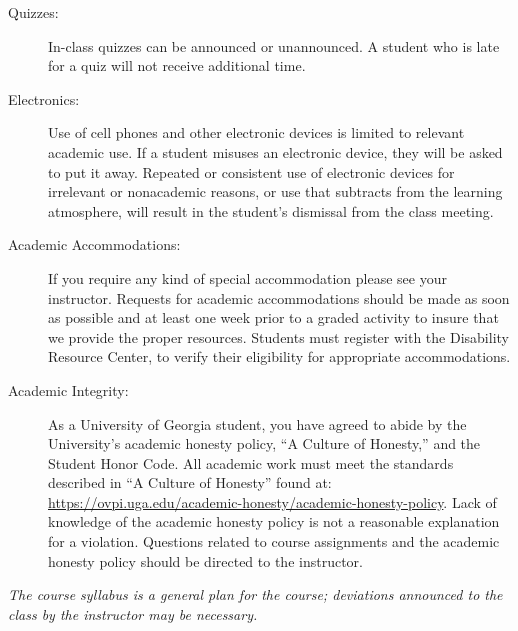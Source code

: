 \documentclass[letterpaper,11pt]{article}
\begin{document}
\begin{description}



\item[Quizzes:] In-class quizzes can be announced or unannounced. A student who is late for a quiz will not receive additional time.

\item[Electronics:] Use of cell phones and other electronic devices is limited to relevant academic use. If a student misuses an electronic device, they will be asked to  put it away. Repeated or consistent use of electronic devices for irrelevant or nonacademic reasons, or use that subtracts from the learning atmosphere, will result in the student's dismissal from the class meeting.

\item[Academic Accommodations:] If you require any kind of special
  accommodation please see your instructor.  Requests for academic
  accommodations should be made as soon as possible and at least one
  week prior to a graded activity to insure that we provide the proper
  resources.  Students must register with the Disability Resource
  Center, to verify their eligibility for appropriate accommodations.
  
\item[Academic Integrity:] As a University of Georgia student, you have
  agreed to abide by the University's academic honesty policy, ``A
  Culture of Honesty,'' and the Student Honor Code. All academic work
  must meet the standards described in ``A Culture of Honesty'' found
  at:
  \url{https://ovpi.uga.edu/academic-honesty/academic-honesty-policy}. Lack
  of knowledge of the academic honesty policy is not a reasonable
  explanation for a violation. Questions related to course assignments
  and the academic honesty policy should be directed to the
  instructor.




%


\end{description}
\vfill
\begin{center}
\small{\emph{The course syllabus is a general plan for the course;
  deviations announced to the class by the instructor may be
  necessary.}}
\end{center}
\end{document}
